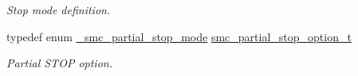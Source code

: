 \begin{DoxyCompactItemize}
\begin{DoxyCompactList}\small\item\em Stop mode definition. \end{DoxyCompactList}\item 
\mbox{\label{group__smc_gaf4ac8e3c162dfdfca1ab17fc2d78bf82}} 
typedef enum \mbox{\hyperlink{group__smc_gaa8d9e56e87c773e0c77995ba8f7fbef1}{\+\_\+smc\+\_\+partial\+\_\+stop\+\_\+mode}} \mbox{\hyperlink{group__smc_gaf4ac8e3c162dfdfca1ab17fc2d78bf82}{smc\+\_\+partial\+\_\+stop\+\_\+option\+\_\+t}}
\begin{DoxyCompactList}\small\item\em Partial S\+T\+OP option. \end{DoxyCompactList}\end{DoxyCompactItemize}
